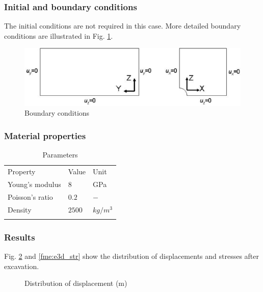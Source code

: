 \subsubsection*{Initial and boundary conditions}
The initial conditions are not required in this case. More detailed boundary conditions are illustrated in Fig. \ref{fme:e3d_g_bc}.
\begin{figure}[!hbt]
  \begin{center}
    \includegraphics[scale=0.5]{M/e3d_g_bc.eps}
  \end{center}
  \caption{Boundary conditions}
  \label{fme:e3d_g_bc}
\end{figure} 
 

\subsubsection*{Material properties}

 \begin{table}[!htb]
\centering
\begin{tabular}{lll}
\hline\hline\noalign{\smallskip}
Property & Value & Unit \\
\noalign{\smallskip}\hline\noalign{\smallskip}
Young's modulus & $8$ & GPa \\
Poisson's ratio & $0.2$ & $-$ \\
Density & $2500$ & $kg/m^3$ \\
\noalign{\smallskip}\hline\hline
\end{tabular}
\caption{Parameters}
\label{tme:e3d_prop}
\end{table}

\subsubsection*{Results}
Fig. \ref{fme:e3d_disp} and \ref{fme:e3d_str} show the distribution of displacements and stresses after excavation. 

 \begin{figure}[!thb]
  \begin{center}
  \end{center}
  \caption{Distribution of displacement (m)}
  \label{fme:e3d_disp}
\end{figure}

